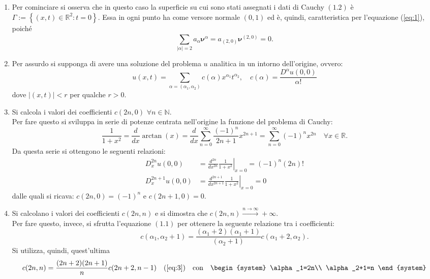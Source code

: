 \begin{example}
\begin{enumerate}
\item
Per cominciare si osserva che in questo caso la superficie su cui sono stati assegnati i dati di Cauchy $(1.2)$ è 
$\Gamma:=\left\lbrace(x,t) \in \mathbb{R}^2:t=0\right\rbrace$. Essa in ogni punto ha come versore normale $(0,1)$ ed è, quindi,
caratteristica per l'equazione (\ref{eq:1}), poiché
$$\sum_{|\alpha|=2}^{\;} a_\alpha \boldsymbol{\nu}^\alpha = a_{(2,0)}\boldsymbol{\nu}^{(2,0)} = 0.$$
\item
Per assurdo si supponga di avere una soluzione del problema $u$ analitica in un intorno dell'origine, ovvero:
$$u(x,t) = \sum_{\alpha = (\alpha_1, \alpha_2) }^{\;} c(\alpha) x^{\alpha_1} t ^{\alpha_2}, \quad
 c(\alpha) = \frac{D^\alpha u(0,0)}{\alpha!}$$
dove $|(x,t)|<r$ per qualche $r>0$.
\item
Si calcola i valori dei coefficienti $c(2n,0)$ $\forall n \in \mathbb{N}$.\\
Per fare questo si sviluppa in serie di potenze centrata nell'origine la funzione del problema di Cauchy:
$$\frac{1}{1+x^2} = \frac{d}{dx}\arctan(x) = \frac{d}{dx}\sum_{n=0}^{\infty}\frac{(-1)^n}{2n+1}x^{2n+1} 
= \sum_{n=0}^{\infty}(-1)^n x^{2n} \quad \forall x \in \mathbb{R}.$$
Da questa serie si ottengono le seguenti relazioni:
\begin{align*}
D_x^{2n}u(0,0) &= \frac{d^{2n}}{dx^{2n}} \left. \frac{1}{1+x^2}\right|_{x=0} = (-1)^n (2n)!\\
D_x^{2n+1}u(0,0) &= \frac{d^{2n+1}}{dx^{2n+1}} \left. \frac{1}{1+x^2} \right|_{x=0} = 0
\end{align*} 
dalle quali si ricava: $c(2n,0)=(-1)^n$ e $c(2n+1,0)=0$.
\item
Si calcolano i valori dei coefficienti $c(2n,n)$ e si dimostra che  $c(2n,n) \xrightarrow{n\rightarrow\infty} +\infty$.\\
Per fare questo, invece, si sfrutta l'equazione $(1.1)$ per ottenere la seguente relazione tra i coefficienti:
\begin{equation} 
\label{eq:3}
c(\alpha_1,\alpha_2+1) = \frac{(\alpha_1+2)(\alpha_1+1)}{(\alpha_2+1)}c(\alpha_1+2,\alpha_2).
\end{equation}
Si utilizza, quindi, quest'ultima 
\begin{align*}
c(2n,n) &= \frac{(2n+2)(2n+1)}{n}c(2n+2,n-1)   &(\ref{eq:3})\quad\text{con} \quad 
\begin{system}
\alpha_1=2n\\
\alpha_2+1=n
\end{system}\\

\end{align*}
\end{enumerate}
\end{example}
